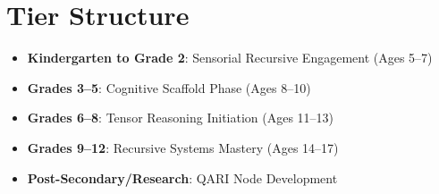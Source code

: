 \documentclass[11pt]{article}
\theoremstyle{plain}
\theoremstyle{definition}
\begin{document}
\section*{Tier Structure}
\begin{itemize}
\item \textbf{Kindergarten to Grade 2}: Sensorial Recursive Engagement (Ages 5--7)
\item \textbf{Grades 3--5}: Cognitive Scaffold Phase (Ages 8--10)
\item \textbf{Grades 6--8}: Tensor Reasoning Initiation (Ages 11--13)
\item \textbf{Grades 9--12}: Recursive Systems Mastery (Ages 14--17)
\item \textbf{Post-Secondary/Research}: QARI Node Development
\end{itemize}
\end{document}
